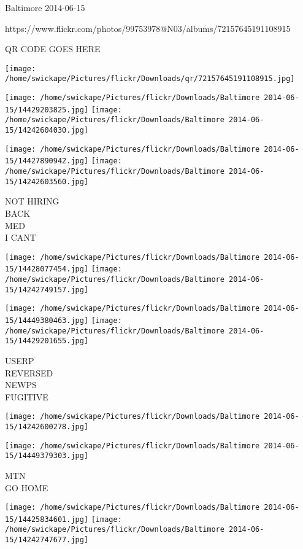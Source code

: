 \documentclass[10pt,letterpaper]{article}
\begin{document}
Baltimore 2014-06-15

https://www.flickr.com/photos/99753978@N03/albums/72157645191108915

QR CODE GOES HERE

\texttt{[image: /home/swickape/Pictures/flickr/Downloads/qr/72157645191108915.jpg]}
\pagebreak

\texttt{[image: /home/swickape/Pictures/flickr/Downloads/Baltimore 2014-06-15/14429203825.jpg]}
\texttt{[image: /home/swickape/Pictures/flickr/Downloads/Baltimore 2014-06-15/14242604030.jpg]}

\texttt{[image: /home/swickape/Pictures/flickr/Downloads/Baltimore 2014-06-15/14427890942.jpg]}
\texttt{[image: /home/swickape/Pictures/flickr/Downloads/Baltimore 2014-06-15/14242603560.jpg]}

NOT HIRING\\
BACK\\
MED\\
I CANT\\
\pagebreak

\texttt{[image: /home/swickape/Pictures/flickr/Downloads/Baltimore 2014-06-15/14428077454.jpg]}
\texttt{[image: /home/swickape/Pictures/flickr/Downloads/Baltimore 2014-06-15/14242749157.jpg]}

\texttt{[image: /home/swickape/Pictures/flickr/Downloads/Baltimore 2014-06-15/14449380463.jpg]}
\texttt{[image: /home/swickape/Pictures/flickr/Downloads/Baltimore 2014-06-15/14429201655.jpg]}

USERP\\
REVERSED\\
NEWPS\\
FUGITIVE\\
\pagebreak

\texttt{[image: /home/swickape/Pictures/flickr/Downloads/Baltimore 2014-06-15/14242600278.jpg]}

\vspace{0.25in}
\texttt{[image: /home/swickape/Pictures/flickr/Downloads/Baltimore 2014-06-15/14449379303.jpg]}

MTN\\
GO HOME\\
\pagebreak

\texttt{[image: /home/swickape/Pictures/flickr/Downloads/Baltimore 2014-06-15/14425834601.jpg]}
\texttt{[image: /home/swickape/Pictures/flickr/Downloads/Baltimore 2014-06-15/14242747677.jpg]}
\end{document}
